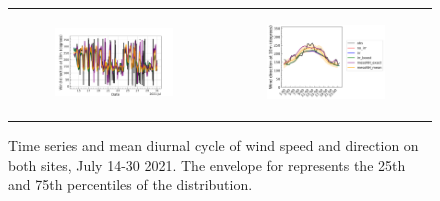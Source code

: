 \begin{figure}[hbtp]
\begin{tabular}{cc}
        \begin{subfigure}[t]{0.5\textwidth}
            \caption{}
            \includegraphics[width=\textwidth]{images/chap5/SOP_TS_DC/time_series_elsplans_wind_direction_10m.png}
        \end{subfigure} &
        \begin{subfigure}[t]{0.5\textwidth}
            \caption{}
            \includegraphics[width=\textwidth]{images/chap5/SOP_TS_DC/diurnal_cycle_elsplans_wind_direction_10m.png}
        \end{subfigure} \\
    \end{tabular}
    \caption{Time series and mean diurnal cycle of wind speed and direction on both sites, July 14-30 2021. The envelope for \mesomean represents the 25th and 75th percentiles of the distribution.}
    \label{fig:bothsites_wind}
\end{figure}

\hfill

